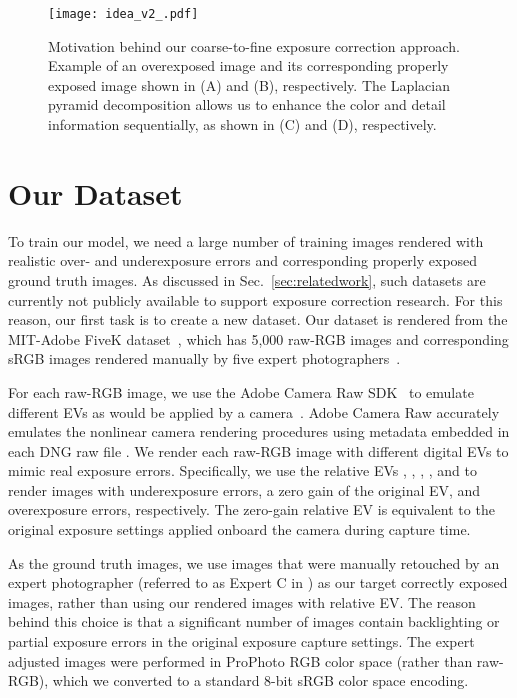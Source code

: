 \documentclass[final]{cvpr}
\begin{document}
\begin{figure}[t]
\centering
\texttt{[image: idea\_v2\_.pdf]}
\vspace{-6mm}
\caption{Motivation behind our coarse-to-fine exposure correction approach. Example of an overexposed image and its corresponding properly exposed image shown in (A) and (B), respectively. The Laplacian pyramid decomposition allows us to enhance the color and detail information sequentially, as shown in (C) and (D), respectively.\vspace{-4mm}}
\label{fig:idea}
\end{figure}

\section{Our Dataset} \label{subsec:data}

To train our model, we need a large number of training images rendered with realistic over-  and underexposure errors and corresponding properly exposed ground truth images.
As discussed in Sec.~\ref{sec:relatedwork}, such datasets are currently not publicly available to support exposure correction research. For this reason, our first task is to create a new dataset.  Our dataset is rendered from the MIT-Adobe FiveK dataset~\cite{fivek}, which has 5,000 raw-RGB images and corresponding sRGB images rendered manually by five expert photographers~\cite{fivek}.

For each raw-RGB image, we use the Adobe Camera Raw SDK~\cite{CameraRaw} to emulate different EVs as would be applied by a camera~\cite{schewe2010real}. Adobe Camera Raw accurately emulates the nonlinear camera rendering procedures using metadata embedded in each DNG raw file \cite{afifi2019color, schewe2010real}. We render each raw-RGB image with different digital EVs to mimic real exposure errors. Specifically, we use the  relative EVs , , , , and  to render images with underexposure errors, a zero gain of the original EV, and overexposure errors, respectively. The zero-gain relative EV is equivalent to the original exposure settings applied onboard the camera during capture time.

As the ground truth images, we use images that were manually retouched by an expert photographer (referred to as Expert C in \cite{fivek}) as our target correctly exposed images, rather than using our rendered images with  relative EV. The reason behind this choice is that a significant number of images contain backlighting or partial exposure errors in the original exposure capture settings. The expert adjusted images were performed in ProPhoto RGB color space \cite{fivek} (rather than raw-RGB), which we converted to a standard 8-bit sRGB color space encoding.
\end{document}
